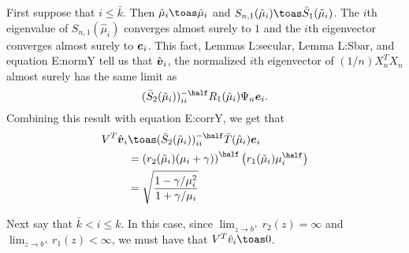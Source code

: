 First suppose that $i \leq \bar k$.  Then $\hat \mu_i \toas \tilde \mu_i$ and
$S_{n,1}(\hat \mu_i) \toas \bar S_1 (\tilde \mu_i)$.  The $i$th eigenvalue
of $S_{n,1} (\hat \mu_i)$ converges almost surely to $1$ and the $i$th
eigenvector converges almost surely to $\boldsymbol{e}_i$.  This fact, 
Lemmas {L:secular}, Lemma {L:Sbar}, and equation {E:normY} 
tell us that $\hat {\boldsymbol{v}}_i$, the normalized $i$th eigenvector of
$(1/n) X_n^T X_n$ almost surely has the same limit as
\[
    (\bar S_2(\tilde \mu_i))_{ii}^{-\half} R_1(\tilde \mu_i) \Psi_n \be_i.
\]
Combining this result with equation {E:corrY}, we get that
\begin{align*}
    V^T \hat \bv_i
        &\toas
        (\bar S_2(\tilde \mu_i))_{ii}^{-\half} \bar T(\tilde \mu_i) \be_i \\
        &= \left( r_2( \tilde \mu_i ) (\mu_i + \gamma )\right)^\half
           \left( r_1( \tilde \mu_i ) \mu_i^\half \right) \\
        &= \sqrt{
                \frac{ 1 - \gamma/\mu_i^2}
                     { 1 + \gamma/\mu_i  }
           }
\end{align*}

Next say that $\bar k < i \leq k$.  In this case, since 
$\lim_{z \to b^+} r_2(z) = \infty$ and $\lim_{z \to b^+} r_1(z) < \infty$, we must have that  $V^T \hat v_i \toas 0$.



